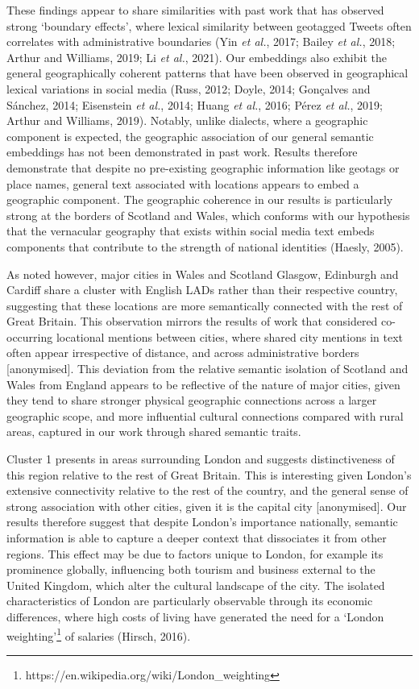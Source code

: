 \documentclass[
]{article}
\begin{document}
These findings appear to share similarities with past work that has
observed strong `boundary effects', where lexical similarity between
geotagged Tweets often correlates with administrative boundaries (Yin
\emph{et al.}, 2017; Bailey \emph{et al.}, 2018; Arthur and Williams,
2019; Li \emph{et al.}, 2021). Our embeddings also exhibit the general
geographically coherent patterns that have been observed in geographical
lexical variations in social media (Russ, 2012; Doyle, 2014; Gonçalves
and Sánchez, 2014; Eisenstein \emph{et al.}, 2014; Huang \emph{et al.},
2016; Pérez \emph{et al.}, 2019; Arthur and Williams, 2019). Notably,
unlike dialects, where a geographic component is expected, the
geographic association of our general semantic embeddings has not been
demonstrated in past work. Results therefore demonstrate that despite no
pre-existing geographic information like geotags or place names, general
text associated with locations appears to embed a geographic component.
The geographic coherence in our results is particularly strong at the
borders of Scotland and Wales, which conforms with our hypothesis that
the vernacular geography that exists within social media text embeds
components that contribute to the strength of national identities
(Haesly, 2005).

As noted however, major cities in Wales and Scotland Glasgow, Edinburgh
and Cardiff share a cluster with English LADs rather than their
respective country, suggesting that these locations are more
semantically connected with the rest of Great Britain. This observation
mirrors the results of work that considered co-occurring locational
mentions between cities, where shared city mentions in text often appear
irrespective of distance, and across administrative borders
{[}anonymised{]}. This deviation from the relative semantic isolation of
Scotland and Wales from England appears to be reflective of the nature
of major cities, given they tend to share stronger physical geographic
connections across a larger geographic scope, and more influential
cultural connections compared with rural areas, captured in our work
through shared semantic traits.

Cluster 1 presents in areas surrounding London and suggests
distinctiveness of this region relative to the rest of Great Britain.
This is interesting given London's extensive connectivity relative to
the rest of the country, and the general sense of strong association
with other cities, given it is the capital city {[}anonymised{]}. Our
results therefore suggest that despite London's importance nationally,
semantic information is able to capture a deeper context that
dissociates it from other regions. This effect may be due to factors
unique to London, for example its prominence globally, influencing both
tourism and business external to the United Kingdom, which alter the
cultural landscape of the city. The isolated characteristics of London
are particularly observable through its economic differences, where high
costs of living have generated the need for a `London
weighting'\footnote{https://en.wikipedia.org/wiki/London\_weighting} of
salaries (Hirsch, 2016).
\end{document}
